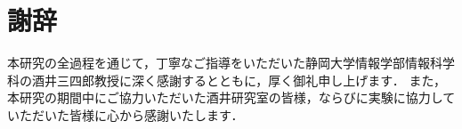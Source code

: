 \chapter*{謝辞}
本研究の全過程を通じて，丁寧なご指導をいただいた静岡大学情報学部情報科学科の酒井三四郎教授に深く感謝するとともに，厚く御礼申し上げます．
また，本研究の期間中にご協力いただいた酒井研究室の皆様，ならびに実験に協力していただいた皆様に心から感謝いたします．